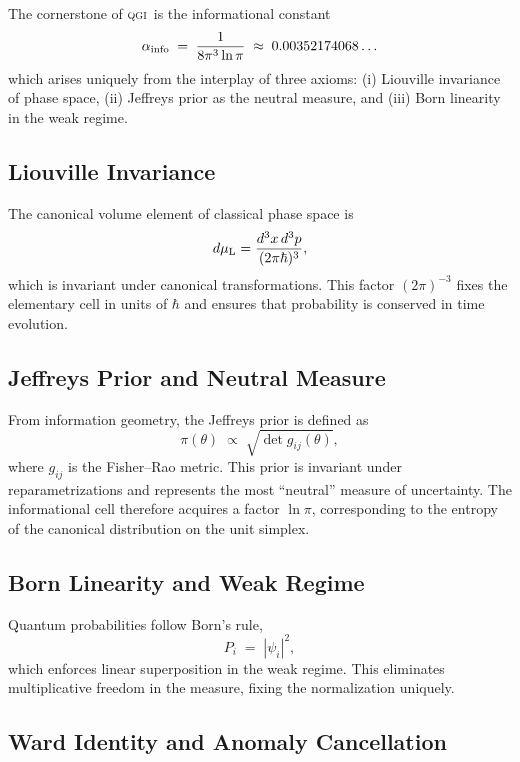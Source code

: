 \documentclass{article}
\numberwithin{equation}{section}
\theoremstyle{plain}
\theoremstyle{definition}
\theoremstyle{remark}
\newcommand{\qgi}{\textsc{qgi}}
\newcommand{\ainfoexact}{\frac{1}{8\pi^3\ln\pi}}
\newcommand{\ainfoapprox}{0.00352174068}
\begin{document}
The cornerstone of \qgi\ is the informational constant
\begin{equation}
\alpha_{\rm info} \;=\; \ainfoexact \;\approx\; \ainfoapprox\ldots
\end{equation}
which arises uniquely from the interplay of three axioms: 
(i) Liouville invariance of phase space, 
(ii) Jeffreys prior as the neutral measure, 
and (iii) Born linearity in the weak regime.

\subsection{Liouville Invariance}
The canonical volume element of classical phase space is
\begin{equation}
d\mu_{\rm L} = \frac{d^3x \, d^3p}{(2\pi\hbar)^3},
\end{equation}
which is invariant under canonical transformations. 
This factor $(2\pi)^{-3}$ fixes the elementary cell in units of $\hbar$ and ensures that probability is conserved in time evolution.

\subsection{Jeffreys Prior and Neutral Measure}
From information geometry, the Jeffreys prior is defined as
\begin{equation}
\pi(\theta) \;\propto\; \sqrt{\det g_{ij}(\theta)},
\end{equation}
where $g_{ij}$ is the Fisher–Rao metric. 
This prior is invariant under reparametrizations and represents the most ``neutral'' measure of uncertainty. 
The informational cell therefore acquires a factor $\ln \pi$, corresponding to the entropy of the canonical distribution on the unit simplex.

\subsection{Born Linearity and Weak Regime}
Quantum probabilities follow Born's rule,
\begin{equation}
P_i \;=\; |\psi_i|^2,
\end{equation}
which enforces linear superposition in the weak regime. 
This eliminates multiplicative freedom in the measure, fixing the normalization uniquely.

\subsection{Ward Identity and Anomaly Cancellation}
\label{subsec:ward_identity}
\end{document}
